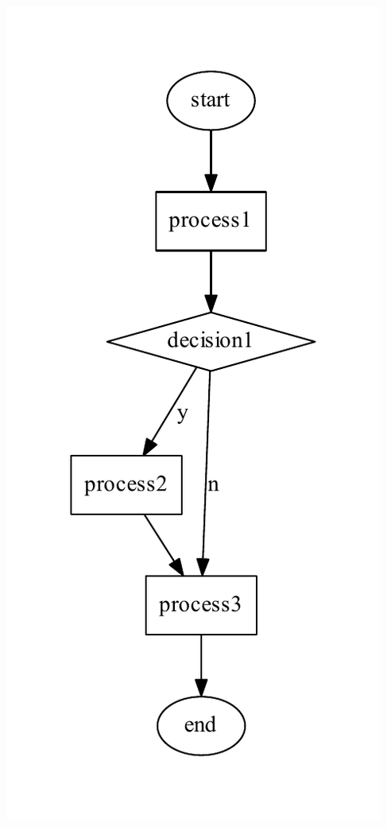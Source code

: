 \begin{center}

\begin{DoxyImageNoCaption}
  \mbox{\includegraphics[width=\textwidth]{dot_inline_dotgraph_1}}
\end{DoxyImageNoCaption}
\end{center}



